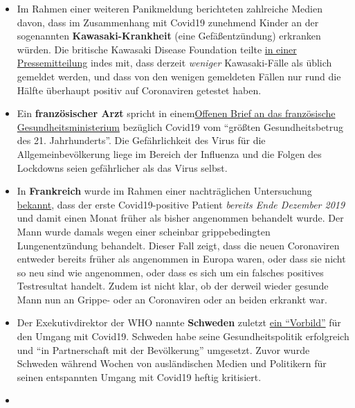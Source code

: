\begin{itemize}
\tightlist
\item
  Im Rahmen einer weiteren Panikmeldung berichteten zahlreiche Medien
  davon, dass im Zusammenhang mit Covid19 zunehmend Kinder an der
  sogenannten \textbf{Kawasaki-Krankheit} (eine Gefäßentzündung)
  erkranken würden. Die britische Kawasaki Disease Foundation teilte
  \href{https://www.societi.org.uk/kawasaki-disease-and-covid-19/}{in
  einer Pressemitteilung} indes mit, dass derzeit \emph{weniger}
  Kawasaki-Fälle als üblich gemeldet werden, und dass von den wenigen
  gemeldeten Fällen nur rund die Hälfte überhaupt positiv auf
  Coronaviren getestet haben.
\item
  Ein \textbf{französischer Arzt} spricht in
  einem\href{https://covidinfos.net/covid19/la-lettre-dun-praticien-hospitalier-adressee-au-ministere-de-la-sante-denonce-une-arnaque-sanitaire/604/}{Offenen
  Brief an das französische Gesundheits­ministerium} bezüglich Covid19
  vom ``größten Gesundheitsbetrug des 21. Jahrhunderts''. Die
  Gefährlichkeit des Virus für die Allgemeinbevölkerung liege im Bereich
  der Influenza und die Folgen des Lockdowns seien gefährlicher als das
  Virus selbst.
\item
  In \textbf{Frankreich} wurde im Rahmen einer nachträglichen
  Untersuchung
  \href{https://www.reuters.com/article/us-health-coronavirus-france-retests/frances-early-covid-19-case-may-hold-clues-to-pandemics-start-idUSKBN22H15R}{bekannt},
  dass der erste Covid19-positive Patient \emph{bereits Ende Dezember
  2019} und damit einen Monat früher als bisher angenommen behandelt
  wurde. Der Mann wurde damals wegen einer scheinbar grippebedingten
  Lungenentzündung behandelt. Dieser Fall zeigt, dass die neuen
  Coronaviren entweder bereits früher als angenommen in Europa waren,
  oder dass sie nicht so neu sind wie angenommen, oder dass es sich um
  ein falsches positives Testresultat handelt. Zudem ist nicht klar, ob
  der derweil wieder gesunde Mann nun an Grippe- oder an Coronaviren
  oder an beiden erkrankt war.
\item
  Der Exekutivdirektor der WHO nannte \textbf{Schweden} zuletzt
  \href{https://www.nau.ch/news/schweiz/coronavirus-who-nennt-schweden-ein-vorbild-65701044}{ein
  ``Vorbild''} für den Umgang mit Covid19. Schweden habe seine
  Gesundheitspolitik erfolgreich und ``in Partnerschaft mit der
  Bevölkerung'' umgesetzt. Zuvor wurde Schweden während Wochen von
  ausländischen Medien und Politikern für seinen entspannten Umgang mit
  Covid19 heftig kritisiert.
\item

\end{itemize}

